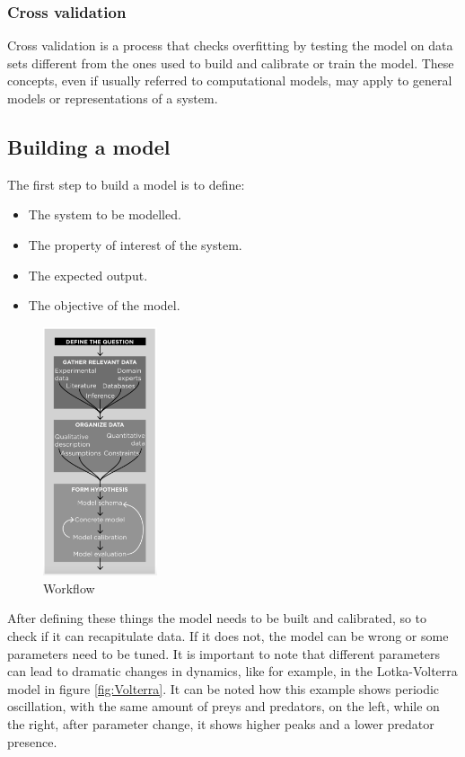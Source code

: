     \subsubsection{Cross validation}
    Cross validation is a process that checks overfitting by testing the model on data sets different from the ones used to build and calibrate or train the model.
  These concepts, even if usually referred to computational models, may apply to general models or representations of a system.

  \subsection{Building a model}
  The first step to build a model is to define:

  \begin{multicols}{2}
    \begin{itemize}
      \item The system to be modelled.
      \item The property of interest of the system.
      \item The expected output.
      \item The objective of the model.
    \end{itemize}
  \end{multicols}

  \begin{figure}[H]
    \centering
    \includegraphics[width=0.3\textwidth]{workflow.png}
    \caption{Workflow}
  \end{figure}

  After defining these things the model needs to be built and calibrated, so to check if it can recapitulate data.
  If it does not, the model can be wrong or some parameters need to be tuned.
  It is important to note that different parameters can lead to dramatic changes in dynamics, like for example, in the Lotka-Volterra model in figure \ref{fig:Volterra}.
  It can be noted how this example shows periodic oscillation, with the same amount of preys and predators, on the left, while on the right, after parameter change, it shows higher peaks and a lower predator presence.

